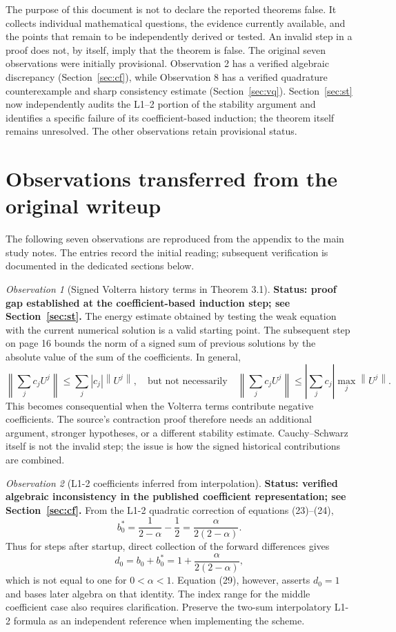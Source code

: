 \documentclass[11pt]{amsart}
\numberwithin{equation}{section}
\theoremstyle{remark}
\newtheorem{observation}{Observation}
\newcommand{\norm}[1]{\left\lVert #1\right\rVert}
\newcommand{\abs}[1]{\left\lvert #1\right\rvert}
\begin{document}
The purpose of this document is not to declare the reported theorems false.
It collects individual mathematical questions, the evidence currently
available, and the points that remain to be independently derived or tested.
An invalid step in a proof does not, by itself, imply that the theorem is
false. The original seven observations were initially provisional.
Observation 2 has a verified algebraic discrepancy (Section~\ref{sec:cf}),
while Observation 8 has a verified quadrature counterexample and sharp
consistency estimate (Section~\ref{sec:vq}). Section~\ref{sec:st} now
independently audits the L1--2 portion of the stability argument and identifies
a specific failure of its coefficient-based induction; the theorem itself
remains unresolved. The other observations retain provisional status.

\section{Observations transferred from the original writeup}
The following seven observations are reproduced from the appendix to the
main study notes. The entries record the initial reading; subsequent
verification is documented in the dedicated sections below.

\begin{observation}[Signed Volterra history terms in Theorem 3.1]
\textbf{Status: proof gap established at the coefficient-based induction
step; see Section~\ref{sec:st}.}
The energy estimate obtained by testing the weak equation with the current
numerical solution is a valid starting point. The subsequent step on page 16
bounds the norm of a signed sum of previous solutions by the absolute value
of the sum of the coefficients. In general,
\[
\norm{\sum_j c_jU^j}\leq\sum_j\abs{c_j}\norm{U^j},
\quad\text{but not necessarily}\quad
\norm{\sum_j c_jU^j}\leq\abs{\sum_j c_j}\max_j\norm{U^j}.
\]
This becomes consequential when the Volterra terms contribute negative
coefficients. The source's contraction proof therefore needs an additional
argument, stronger hypotheses, or a different stability estimate.
Cauchy--Schwarz itself is not the invalid step; the issue is how the signed
historical contributions are combined.
\end{observation}

\begin{observation}[L1-2 coefficients inferred from interpolation]
\textbf{Status: verified algebraic inconsistency in the published
coefficient representation; see Section~\ref{sec:cf}.}
From the L1-2 quadratic correction of equations (23)--(24),
\[
b_0^*=\frac1{2-\alpha}-\frac12=\frac{\alpha}{2(2-\alpha)}.
\]
Thus for steps after startup, direct collection of the forward differences gives
\[
d_0=b_0+b_0^*=1+\frac{\alpha}{2(2-\alpha)},
\]
which is not equal to one for $0<\alpha<1$. Equation (29), however, asserts
$d_0=1$ and bases later algebra on that identity. The index range for the
middle coefficient case also requires clarification. Preserve the two-sum
interpolatory L1-2 formula as an independent reference when implementing the
scheme.
\end{observation}
\end{document}
